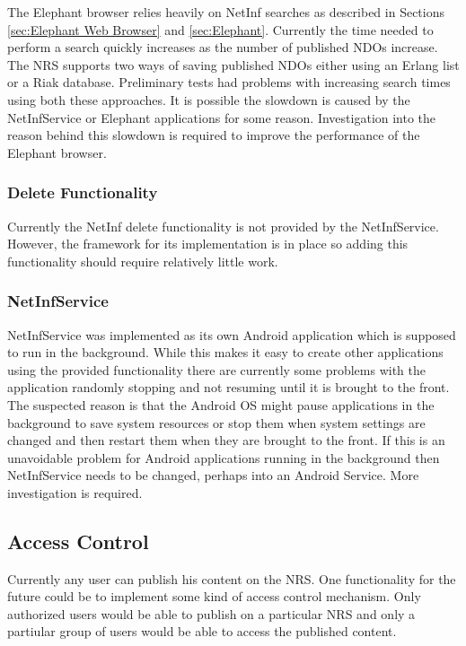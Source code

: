 The Elephant browser relies heavily on NetInf searches as described in Sections \ref{sec:Elephant Web Browser} and \ref{sec:Elephant}. Currently the time needed to perform a search quickly increases as the number of published NDOs increase. The NRS supports two ways of saving published NDOs either using an Erlang list or a Riak database. Preliminary tests had problems with increasing search times using both these approaches. It is possible the slowdown is caused by the NetInfService or Elephant applications for some reason. Investigation into the reason behind this slowdown is required to improve the performance of the Elephant browser.

\subsubsection{Delete Functionality}

Currently the NetInf delete functionality is not provided by the NetInfService. However, the framework for its implementation is in place so adding this functionality should require relatively little work.

\subsubsection{NetInfService}

NetInfService was implemented as its own Android application which is supposed to run in the background. While this makes it easy to create other applications using the provided functionality there are currently some problems with the application randomly stopping and not resuming until it is brought to the front. The suspected reason is that the Android OS might pause applications in the background to save system resources or stop them when system settings are changed and then restart them when they are brought to the front. If this is an unavoidable problem for Android applications running in the background then NetInfService needs to be changed, perhaps into an Android Service. More investigation is required.

\subsection{Access Control}

Currently any user can publish his content on the NRS. One functionality for the future could be to implement some kind of access control mechanism. Only authorized users would be able to publish on a particular NRS and only a partiular group of users would be able to access the published content. 

